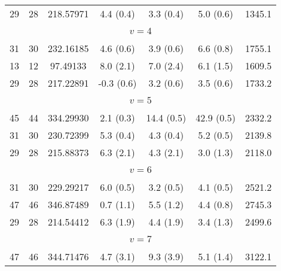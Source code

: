 \begin{table*}[htp]
\begin{tabular}{ccccccc}
 29 & 28 & 218.57971 & 4.4 (0.4) & 3.3 (0.4) & 5.0 (0.6) & 1345.1 \\
&\vspace{-0.75em}\\
\multicolumn{7}{c}{$v = 4$} \\
\vspace{-0.75em}\\
 31 & 30 & 232.16185 & 4.6 (0.6) & 3.9 (0.6) & 6.6 (0.8) & 1755.1 \\
 13 & 12 & 97.49133 & 8.0 (2.1) & 7.0 (2.4) & 6.1 (1.5) & 1609.5 \\
 29 & 28 & 217.22891 & -0.3 (0.6) & 3.2 (0.6) & 3.5 (0.6) & 1733.2 \\
&\vspace{-0.75em}\\
\multicolumn{7}{c}{$v = 5$} \\
\vspace{-0.75em}\\
 45 & 44 & 334.29930 & 2.1 (0.3) & 14.4 (0.5) & 42.9 (0.5) & 2332.2 \\
 31 & 30 & 230.72399 & 5.3 (0.4) & 4.3 (0.4) & 5.2 (0.5) & 2139.8 \\
 29 & 28 & 215.88373 & 6.3 (2.1) & 4.3 (2.1) & 3.0 (1.3) & 2118.0 \\
&\vspace{-0.75em}\\
\multicolumn{7}{c}{$v = 6$} \\
\vspace{-0.75em}\\
 31 & 30 & 229.29217 & 6.0 (0.5) & 3.2 (0.5) & 4.1 (0.5) & 2521.2 \\
 47 & 46 & 346.87489 & 0.7 (1.1) & 5.5 (1.2) & 4.4 (0.8) & 2745.3 \\
 29 & 28 & 214.54412 & 6.3 (1.9) & 4.4 (1.9) & 3.4 (1.3) & 2499.6 \\
&\vspace{-0.75em}\\
\multicolumn{7}{c}{$v = 7$} \\
\vspace{-0.75em}\\
 47 & 46 & 344.71476 & 4.7 (3.1) & 9.3 (3.9) & 5.1 (1.4) & 3122.1 \\
\hline
\end{tabular}

\par 
\end{table*}
